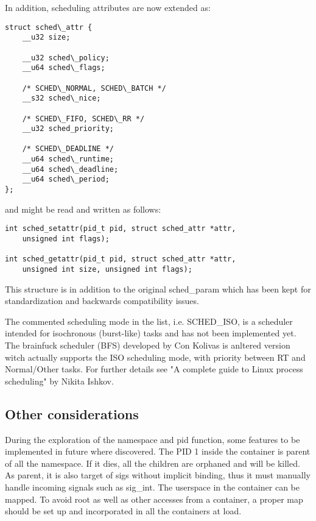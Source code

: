 \documentclass[]{scrartcl}
\begin{document}
In addition, scheduling attributes are now extended as:

\begin{verbatim}
struct sched\_attr {
	__u32 size;
	
	__u32 sched\_policy;
	__u64 sched\_flags;
	
	/* SCHED\_NORMAL, SCHED\_BATCH */
	__s32 sched\_nice;
	
	/* SCHED\_FIFO, SCHED\_RR */
	__u32 sched_priority;
	
	/* SCHED\_DEADLINE */
	__u64 sched\_runtime;
	__u64 sched\_deadline;
	__u64 sched\_period;
};
\end{verbatim}

and might be read and written as follows:


\begin{verbatim}
int sched_setattr(pid_t pid, struct sched_attr *attr,
	unsigned int flags);

int sched_getattr(pid_t pid, struct sched_attr *attr,
	unsigned int size, unsigned int flags);
\end{verbatim}

This structure is in addition to the original sched\_param which has been kept for standardization and backwards compatibility issues.

The commented scheduling mode in the list, i.e. SCHED\_ISO, is a scheduler intended for isochronous (burst-like) tasks and has not been implemented yet. 
The brainfuck scheduler (BFS) developed by Con Kolivas is anltered version witch actually supports the ISO scheduling mode, with priority between RT and Normal/Other tasks.
For further details see "A complete guide to Linux process scheduling"  by Nikita Ishkov.


\subsection{Other considerations}

During the exploration of the namespace and pid function, some features to be implemented in future where discovered. 
The PID 1 inside the container is parent of all the namespace. If it dies, all the children are orphaned and will be killed. As parent, it is also target of sigs without implicit binding, thus it must manually handle incoming signals such as sig\_int.
The userspace in the container can be mapped. To avoid root as well as other accesses from a container, a proper map should be set up and incorporated in all the containers at load.
\end{document}
